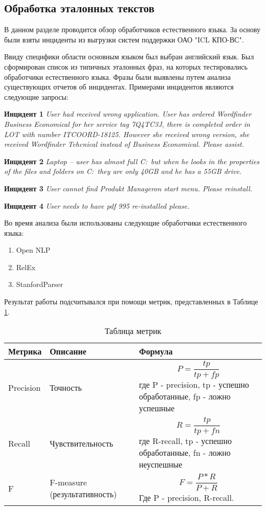 \subsection{Обработка эталонных текстов} \label{sect2_1}
В данном разделе проводится обзор обработчиков естественного языка. За основу были взяты инциденты из выгрузки систем поддержки ОАО "ICL КПО-ВС". \par
Ввиду специфики области основным языком был выбран английский язык. Был сформирован список из типичных эталонных фраз, на которых тестировались обработчики естественного языка. Фразы были выявлены путем анализа существующих отчетов об инцидентах. Примерами инцидентов являются следующие запросы:\par
\textbf{Инцидент 1}
\textit{
User had received wrong application. User has ordered Wordfinder Business Economical for her service tag 7Q4TC3J, there is completed order in LOT with number ITCOORD-18125. However she received wrong version, she received Wordfinder Tehcnical instead of Business Economical. Please assist.
}\par
\textbf{Инцидент 2}
\textit{
Laptop – user has almost full C:\ but when he looks in the properties of the files and folders on C:\ they are only 40GB and he has a 55GB drive.
}\par
\textbf{Инцидент 3}
\textit{
User cannot find Produkt Manageron start menu. Please reinstall. 
}\par
\textbf{Инцидент 4}
\textit{
User needs to have pdf 995 re-installed please.
}\par

Во время анализа были использованы следующие обработчики естественного языка:
\begin {enumerate}
	\item{Open NLP}\cite{OpenNLP}
	\item{RelEx}\cite{OpenCogRelex}
	\item{StanfordParser}\cite{StanfordParser}
\end {enumerate}

Результат работы подсчитывался при помощи метрик, представленных в Таблице \ref{Metrics}. 

\begin{table} [htbp]
  \centering
  \parbox{15cm}{\caption{Таблица метрик}\label{Metrics}}
  \begin{tabular}{| p{5cm} |p{5cm}| p{5cm} |}
  
  \hline
Метрика & Описание & Формула \\
  \hline
 
Precision	& Точность & 
$$ 
P=\frac{tp}{tp+fp}
$$ где P - precision, tp -  успешно обработанные, fp - ложно успешные \\
 \hline
Recall	& Чувствительность & 
$$ 
R=\frac{tp}{tp+fn}
$$ где R-recall, tp - успешно обработанные, fn - ложно неуспешные \\
 \hline
F	& F-measure (результативность) & 
$$ 
F=\frac{P*R}{P+R}
$$ Где P - precision, R-recall.   \\
 \hline
  \end{tabular}
\end{table}

